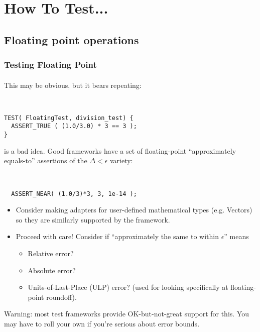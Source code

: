 \section{How To Test...}
\subsection{Floating point operations}
\begin{frame}[fragile,t]
\frametitle{Testing Floating Point}
\framesubtitle{}
This may be obvious, but it bears repeating:
{\scriptsize\
\begin{verbatim}
TEST( FloatingTest, division_test) {
  ASSERT_TRUE ( (1.0/3.0) * 3 == 3 );
}
\end{verbatim}}
is a bad idea.  Good frameworks have a set of floating-point
``approximately equals-to'' assertions of the $\Delta < \epsilon$
variety:
{\scriptsize\
\begin{verbatim}
  ASSERT_NEAR( (1.0/3)*3, 3, 1e-14 );
\end{verbatim}}
\begin{itemize}
  \item Consider making adapters for user-defined mathematical types
    (e.g. Vectors) so they are similarly supported by the framework.
  \item Proceed with care!  Consider if ``approximately the same to
    within $\epsilon$'' means
\begin{itemize}
  \item Relative error?
  \item Absolute error?
  \item Units-of-Last-Place (ULP) error?  (used for looking
    specifically at floating-point roundoff).
\end{itemize}
\end{itemize}
Warning: most test frameworks provide OK-but-not-great support for
this.  You may have to roll your own if you're serious about error bounds.
\end{frame}

